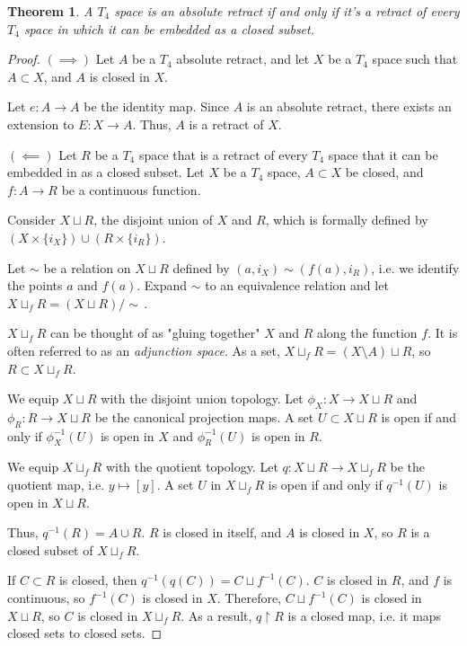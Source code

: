 \documentclass[openany, amssymb, psamsfonts]{amsart}
\newtheorem{thm}{Theorem}[section]
\theoremstyle{definition}
\numberwithin{equation}{section}
\begin{document}
\begin{thm}
A $T_4$ space is an absolute retract if and only if it's a retract of every $T_4$ space in which it can be embedded as a closed subset.
\end{thm}
\begin{proof}
  $(\implies)$ Let $A$ be a $T_4$ absolute retract, and let $X$ be a $T_4$ space such that $A \subset X$, and $A$ is closed in $X$. 

  Let $e: A \to A$ be the identity map. Since $A$ is an absolute retract, there exists an extension to $E: X \to A$. Thus, $A$ is a retract of $X$. 

  $(\impliedby)$ Let $R$ be a $T_4$ space that is a retract of every $T_4$ space that it can be embedded in as a closed subset. Let $X$ be a $T_4$ space, $A\subset X$ be closed, and $f:A \to R$ be a continuous function. 

  Consider $X \sqcup R$, the disjoint union of $X$ and $R$, which is formally defined by $(X \times \{i_X\}) \cup (R \times \{i_R\})$. 

  Let $\sim$ be a relation on $X\sqcup R$ defined by $(a,i_X) \sim (f(a), i_R)$, i.e. we identify the points $a$ and $f(a)$. Expand $\sim$ to an equivalence relation and let $X \sqcup_f R = (X \sqcup R) \mathord/ \sim\,$. 

  $X \sqcup_f R$ can be thought of as "gluing together" $X$ and $R$ along the function $f$. It is often referred to as an \emph{adjunction space}. As a set, $X \sqcup_f R = (X\setminus A) \sqcup R$, so $R \subset X \sqcup_f R$. 

  We equip $X \sqcup R$ with the disjoint union topology. Let $\phi_X: X \to X\sqcup R$ and $\phi_R: R \to X \sqcup R$ be the canonical projection maps. A set $U \subset X \sqcup R$ is open if and only if $\phi_X^{-1}(U)$ is open in $X$ and $\phi_R^{-1}(U)$ is open in $R$.

  We equip $X\sqcup_f R$ with the quotient topology. Let $q: X \sqcup R \to X \sqcup_f R$ be the quotient map, i.e. $y \mapsto [y]$. A set $U$ in $X\sqcup_f R$ is open if and only if $q^{-1}(U)$ is open in $X\sqcup R$.   

  Thus, $q^{-1}(R) = A \cup R$. $R$ is closed in itself, and $A$ is closed in $X$, so $R$ is a closed subset of $X \sqcup_f R$. 

  If $C \subset R$ is closed, then $q^{-1}(q(C)) = C \sqcup f^{-1}(C)$. $C$ is closed in $R$, and $f$ is continuous, so $f^{-1}(C)$ is closed in $X$. Therefore, $C \sqcup f^{-1}(C)$ is closed in $X \sqcup R$, so $C$ is closed in $X \sqcup_f R$. As a result, $q \restriction R$ is a closed map, i.e. it maps closed sets to closed sets. 


\end{proof}
\end{document}
